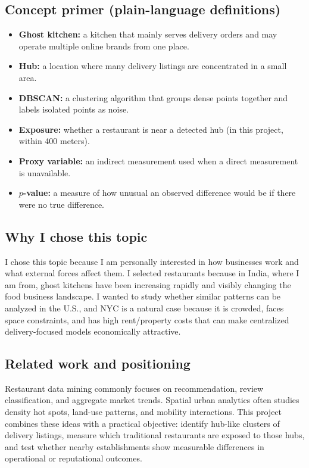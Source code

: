 \documentclass[10pt,twocolumn]{article}
\begin{document}
\subsection{Concept primer (plain-language definitions)}
\begin{itemize}
\item \textbf{Ghost kitchen:} a kitchen that mainly serves delivery orders and may operate multiple online brands from one place.
\item \textbf{Hub:} a location where many delivery listings are concentrated in a small area.
\item \textbf{DBSCAN:} a clustering algorithm that groups dense points together and labels isolated points as noise.
\item \textbf{Exposure:} whether a restaurant is near a detected hub (in this project, within 400 meters).
\item \textbf{Proxy variable:} an indirect measurement used when a direct measurement is unavailable.
\item \textbf{$p$-value:} a measure of how unusual an observed difference would be if there were no true difference.
\end{itemize}

\subsection{Why I chose this topic}
I chose this topic because I am personally interested in how businesses work and what external forces affect them. I selected restaurants because in India, where I am from, ghost kitchens have been increasing rapidly and visibly changing the food business landscape. I wanted to study whether similar patterns can be analyzed in the U.S., and NYC is a natural case because it is crowded, faces space constraints, and has high rent/property costs that can make centralized delivery-focused models economically attractive.

\subsection{Related work and positioning}
Restaurant data mining commonly focuses on recommendation, review classification, and aggregate market trends. Spatial urban analytics often studies density hot spots, land-use patterns, and mobility interactions. This project combines these ideas with a practical objective: identify hub-like clusters of delivery listings, measure which traditional restaurants are exposed to those hubs, and test whether nearby establishments show measurable differences in operational or reputational outcomes.
\end{document}
